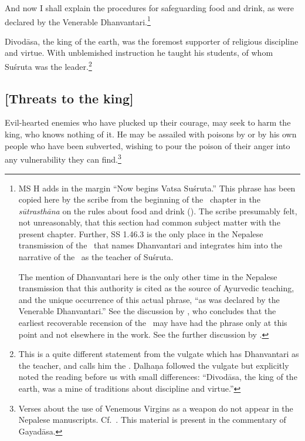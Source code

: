 \begin{translation}
 \item[1--2]  And now I shall explain the procedures for safeguarding food and
drink, as were declared by the Venerable Dhanvantari.\footnote{MS H adds in the
margin  “Now begins Vatsa Suśruta.”  This phrase
has been copied here by the scribe from the beginning of the \SS\ chapter in the
\emph{sūtrasthāna} on the rules about food and drink ().  The
scribe presumably felt, not unreasonably, that this section had common subject
matter with the present chapter.  Further, SS 1.46.3 is the only place in the Nepalese 
transmission of the \SS\ that names Dhanvantari and integrates him into the narrative of the 
\SS\ as the teacher of Suśruta. 
  
 The mention of Dhanvantari here is the only other time in the Nepalese
transmission that this authority is cited as the source of Ayurvedic teaching, and the unique 
occurrence of this actual phrase, “as was declared by the Venerable Dhanvantari.”
See the discussion by \citet[28--32]{kleb-2021b}, who concludes that the earliest
recoverable recension of the \SS\ may have had the phrase only at this point and
not elsewhere in the work. See the further discussion by \citet{birc-2021}.}
 
 \item[3] 

 Divodāsa, the king of the earth, was the foremost supporter of religious
discipline and virtue. With unblemished instruction he taught his students, of
whom Suśruta was the leader.\footnote{This is a quite different statement from
the vulgate which has Dhanvantari as the teacher, and calls him the
 \citep[559]{vulgate}.  Ḍalhaṇa followed the vulgate
but explicitly noted the reading before us with small differences:  “Divodāsa, the king of the earth, was a mine of
traditions about discipline and virtue.”}

\subsection{[Threats to the king]}

\item[4--5]  

Evil-hearted enemies who have plucked up their courage, may seek to harm the king,
who knows nothing of it.  He may be assailed with poisons by or by his own people
who have been subverted, wishing to pour the poison of their anger into any
vulnerability they can find.\footnote{Verses about the use of Venemous Virgins as a weapon
do not appear in the Nepalese manuscripts. Cf.\ \cite[81\,f., 132]{wuja-2003}.  This material 
is present in the commentary of Gayadāsa.} 


\end{translation}
